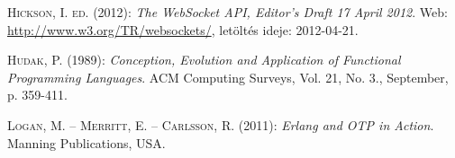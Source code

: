 \documentclass[12pt, a4paper, oneside]{book}
\begin{document}
\begin{thebibliography}{9}
{\scshape Hickson, I. ed.} (2012): \emph{The WebSocket API, Editor's Draft 17
April 2012}. Web: \url{http://www.w3.org/TR/websockets/}, letöltés ideje:
2012-04-21.

{\scshape Hudak, P.} (1989): \emph{Conception, Evolution and Application of Functional
Programming Languages}. ACM Computing Surveys, Vol. 21, No. 3., September, p.
359-411.

{\scshape Logan, M. -- Merritt, E. -- Carlsson, R.} (2011): \emph{Erlang and OTP in Action}.
Manning Publications, USA.

\end{thebibliography}

\clearpage
{}
\printindex
\end{document}
